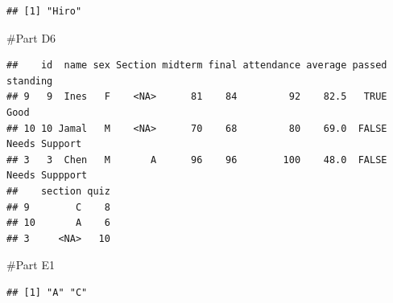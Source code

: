 \documentclass[
]{article}
\newenvironment{Shaded}{\begin{snugshade}}{\end{snugshade}}
\newcommand{\AttributeTok}[1]{\textcolor[rgb]{0.13,0.29,0.53}{#1}}
\newcommand{\ConstantTok}[1]{\textcolor[rgb]{0.56,0.35,0.01}{#1}}
\newcommand{\DecValTok}[1]{\textcolor[rgb]{0.00,0.00,0.81}{#1}}
\newcommand{\FunctionTok}[1]{\textcolor[rgb]{0.13,0.29,0.53}{\textbf{#1}}}
\newcommand{\NormalTok}[1]{#1}
\newcommand{\OtherTok}[1]{\textcolor[rgb]{0.56,0.35,0.01}{#1}}
\newcommand{\SpecialCharTok}[1]{\textcolor[rgb]{0.81,0.36,0.00}{\textbf{#1}}}
\begin{document}
\begin{verbatim}
## [1] "Hiro"
\end{verbatim}

\#Part D6

\begin{Shaded}
\end{Shaded}

\begin{verbatim}
##    id  name sex Section midterm final attendance average passed       standing
## 9   9  Ines   F    <NA>      81    84         92    82.5   TRUE           Good
## 10 10 Jamal   M    <NA>      70    68         80    69.0  FALSE  Needs Support
## 3   3  Chen   M       A      96    96        100    48.0  FALSE Needs Suppport
##    section quiz
## 9        C    8
## 10       A    6
## 3     <NA>   10
\end{verbatim}

\#Part E1

\begin{Shaded}
\end{Shaded}

\begin{verbatim}
## [1] "A" "C"
\end{verbatim}

\begin{Shaded}
\end{Shaded}
\end{document}
